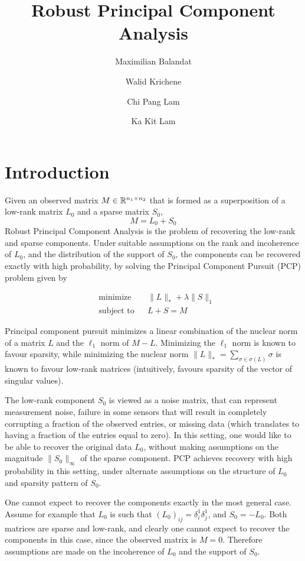 \documentclass{../common/projectreport}
\title{\Large Robust Principal Component Analysis}
\author{Maximilian Balandat \and Walid Krichene \and Chi Pang Lam \and Ka Kit Lam}
\begin{document}
\maketitle

\section{Introduction}
Given an observed matrix $M \in {\mathbb R}^{n_1 \times n_2}$ that is formed as a superposition of a low-rank matrix $L_0$ and a sparse matrix $S_0$,
\[
M = L_0 + S_0
\]
Robust Principal Component Analysis \cite{Candes:2011fk} is the problem of recovering the low-rank and sparse components. Under suitable assumptions on the rank and incoherence of $L_0$, and the distribution of the support of $S_0$, the components can be recovered exactly with high probability, by solving the Principal Component Pursuit (PCP) problem given by

\begin{equation}
\begin{aligned}
&\text{minimize} && \|L\|_* + \lambda \|S\|_1 \\
&\text{subject to} && L+S = M
\label{eq:pcp}
\end{aligned}
\end{equation}

Principal component pursuit minimizes a linear combination of the nuclear norm of a matrix $L$ and the $\ell_1$ norm of $M-L$. Minimizing the $\ell_1$ norm is known to favour sparsity, while minimizing the nuclear norm $\|L\|_* = \sum_{\sigma \in \sigma(L)} \sigma$ is known to favour low-rank matrices (intuitively, favours sparsity of the vector of singular values).

The low-rank component $S_0$ is viewed as a noise matrix, that can represent measurement noise, failure in some sensors that will result in completely corrupting a fraction of the observed entries, or missing data (which translates to having a fraction of the entries equal to zero). In this setting, one would like to be able to recover the original data $L_0$, without making assumptions on the magnitude $\|S_0\|_\infty$ of the sparse component. PCP achieves recovery with high probability in this setting, under alternate assumptions on the structure of $L_0$ and sparsity pattern of $S_0$.

One cannot expect to recover the components exactly in the most general case. Assume for example that $L_0$ is such that $(L_0)_{ij} = \delta_i^1\delta_j^1$, and $S_0 = -L_0$. Both matrices are sparse and low-rank, and clearly one cannot expect to recover the components in this case, since the observed matrix is $M = 0$. Therefore assumptions are made on the incoherence of $L_0$ and the support of $S_0$.
\end{document}

